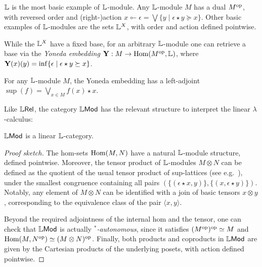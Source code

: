  
 

$\mathbb{L}$ is the most basic example of $\mathbb{L}$-module.
Any $\mathbb{L}$-module $M$ has a dual $M^{\mathrm{op}}$, with reversed order and (right-)action $x\multimapinv \epsilon= \bigvee\{y\mid \epsilon \star y\succeq x\}$.
 Other basic examples of $\mathbb{L}$-modules are the sets $\mathbb{L}^{X}$, with order and action defined pointwise. 
 
 
 While the $\mathbb{L}^{X}$ have a fixed base, for an arbitrary $\mathbb{L}$-module one can retrieve a base via the \emph{Yoneda embedding}
$\mathbf{Y}: M \to \mathrm{Hom}(M^{\mathrm{op}},\mathbb{L})$, where $\mathbf{Y}(x)(y)=\inf\{\epsilon\mid \epsilon\star y\succeq x\}$. 


\begin{proposition}\label{prop:yonemod}
For any $\mathbb{L}$-module $M$, the Yoneda embedding has a left-adjoint $\sup(f)=\bigvee_{x\in M}f(x)\star x$.
\end{proposition}


Like $\mathbb{L} \mathsf{Rel}$, the category $\mathbb{L}\mathsf{Mod}$ has the relevant structure to interpret the linear $\lambda$-calculus:
\begin{proposition}
$\mathbb{L}\mathsf{Mod}$ is a linear $\mathbb{L}$-category.
\end{proposition}
\begin{proof}[Proof sketch]
The hom-sets $\mathrm{Hom}(M,N)$ have a natural $\mathbb{L}$-module structure, defined pointwise. Moreover, the tensor product of $\mathbb{L}$-modules $M\otimes N$ \cite{} can be defined as the quotient of the usual tensor product of sup-lattices (see e.g.~\cite{}), under the smallest congruence containing all pairs $(\{(\epsilon \star x,y)\},\{(x,\epsilon\star y)\})$.
Notably, any element of $M\otimes N$ can be identified with a join of basic tensors $x\otimes y$, corresponding to the equivalence class of the pair $\langle x,y\rangle$.

Beyond the required adjointness of the internal hom and the tensor, one can check that $\mathbb{L}\mathsf{Mod}$ is actually \emph{$^{*}$-autonomous}, since it satisfies $(M^{\mathrm{op}})^{\mathrm{op}}\simeq M$ and 
$\mathrm{Hom}(M,N^{\mathrm{op}})\simeq (M\otimes N)^{\mathrm{op}}$.
Finally, both products and coproducts in $\mathbb{L}\mathsf{Mod}$ are given by the Cartesian products of the underlying posets, with action defined pointwise.
%
\end{proof}


